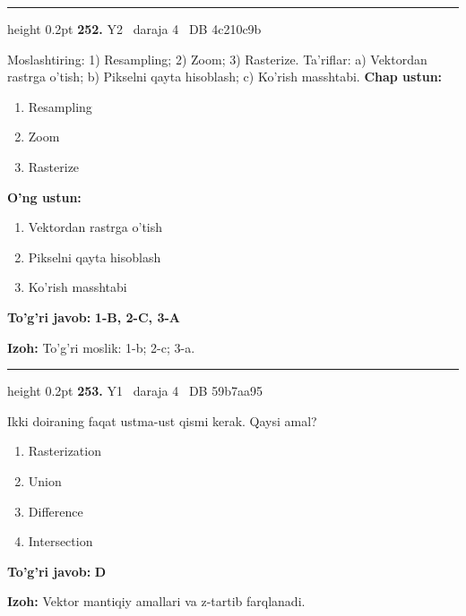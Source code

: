 \documentclass[10pt,a4paper,oneside]{article}
\begin{document}
\vspace{2mm}\hrule height 0.2pt \vspace{4mm}
\hypertarget{q252}{\textbf{\color{ink}252.}}  {\color{muted}\scriptsize Y2 \textbullet\ daraja 4 \textbullet\ DB 4c210c9b}
\par
Moslashtiring: 1) Resampling; 2) Zoom; 3) Rasterize. Ta'riflar: a) Vektordan rastrga o'tish; b) Pikselni qayta hisoblash; c) Ko'rish masshtabi.
\textbf{\footnotesize Chap ustun:}
\begin{enumerate}[label=\arabic*),leftmargin=9mm]
\item Resampling
\item Zoom
\item Rasterize
\end{enumerate}
\textbf{\footnotesize O'ng ustun:}
\begin{enumerate}[label=\Alph*),leftmargin=9mm]
\item Vektordan rastrga o'tish
\item Pikselni qayta hisoblash
\item Ko'rish masshtabi
\end{enumerate}
\begin{tcolorbox}[enhanced,breakable,colback=teal!4,colframe=teal!45!black,boxrule=0.45pt,arc=1.2mm,left=2.8mm,right=2.8mm,top=2mm,bottom=2mm,before skip=2mm,after skip=2mm]
\textbf{\color{teal}To'g'ri javob:} \textbf{1-B, 2-C, 3-A}
\par\smallskip
\textbf{Izoh:} To'g'ri moslik: 1-b; 2-c; 3-a.
\end{tcolorbox}
\vspace{2mm}\hrule height 0.2pt \vspace{4mm}
\hypertarget{q253}{\textbf{\color{ink}253.}}  {\color{muted}\scriptsize Y1 \textbullet\ daraja 4 \textbullet\ DB 59b7aa95}
\par
Ikki doiraning faqat ustma-ust qismi kerak. Qaysi amal?
\begin{enumerate}[label=\Alph*),leftmargin=9mm]
\item Rasterization
\item Union
\item Difference
\item Intersection
\end{enumerate}
\begin{tcolorbox}[enhanced,breakable,colback=teal!4,colframe=teal!45!black,boxrule=0.45pt,arc=1.2mm,left=2.8mm,right=2.8mm,top=2mm,bottom=2mm,before skip=2mm,after skip=2mm]
\textbf{\color{teal}To'g'ri javob:} \textbf{D}
\par\smallskip
\textbf{Izoh:} Vektor mantiqiy amallari va z-tartib farqlanadi.
\end{tcolorbox}
\end{document}
